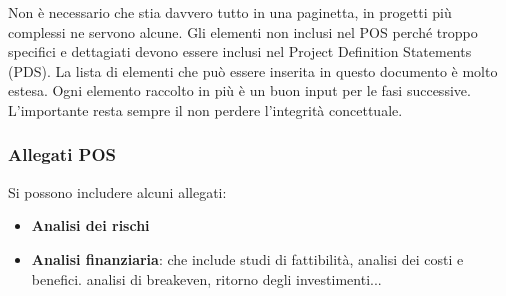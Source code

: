 \noindent Non è necessario che stia davvero tutto in una paginetta, in progetti più complessi ne servono alcune. Gli elementi non inclusi nel POS perché troppo specifici e dettagiati devono essere inclusi nel Project Definition Statements (PDS). La lista di elementi che può essere inserita in questo documento è molto estesa. Ogni elemento raccolto in più è un buon input per le fasi successive. L'importante resta sempre il non perdere l'integrità concettuale.
\subsubsection{Allegati POS}
Si possono includere alcuni allegati:
\begin{itemize}
	\item \textbf{Analisi dei rischi}
	\item \textbf{Analisi finanziaria}: che include studi di fattibilità, analisi dei costi e benefici. analisi di breakeven, ritorno degli investimenti...
\end{itemize}

